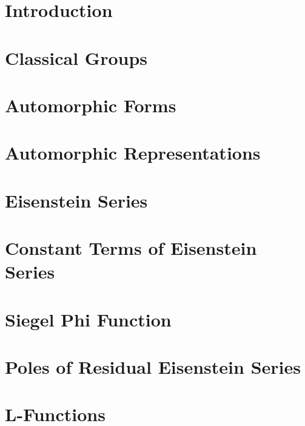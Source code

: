 \documentclass[10pt, openany]{book}
\numberwithin{equation}{section}
\begin{document}
\chapter*{Introduction}


\tableofcontents
{}

\chapter{Classical Groups}

\chapter{Automorphic Forms}

\chapter{Automorphic Representations}

\chapter{Eisenstein Series}

\chapter{Constant Terms of Eisenstein Series}

\chapter{Siegel Phi Function}

\chapter{Poles of Residual Eisenstein Series}



    \appendix
\chapter{L-Functions}




\newpage


\end{document}
